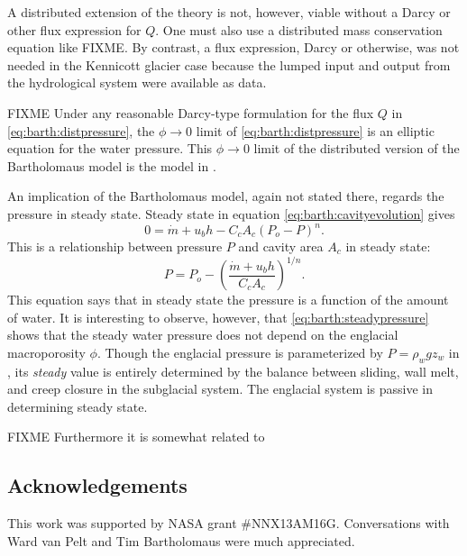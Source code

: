 \documentclass[twocolumn,letterpaper]{igs}
\begin{document}
A distributed extension of the \cite{Bartholomausetal2011} theory is not, however, viable without a Darcy or other flux expression for $Q$.  One must also use a distributed mass conservation equation like FIXME.  By contrast, a flux expression, Darcy or otherwise, was not needed in the Kennicott glacier case because the lumped input and output from the hydrological system were available as data.

FIXME  Under any reasonable Darcy-type formulation for the flux $Q$ in \eqref{eq:barth:distpressure}, the $\phi\to 0$ limit of \eqref{eq:barth:distpressure} is an elliptic equation for the water pressure.  This $\phi\to 0$ limit of the distributed version of the Bartholomaus model is the model in \cite{Schoofetal2012}.

An implication of the Bartholomaus model, again not stated there, regards the pressure in steady state.  Steady state in equation \eqref{eq:barth:cavityevolution} gives
\begin{equation*}
0 = \dot m + u_b h - C_c A_c (P_o-P)^n.
\end{equation*}
This is a relationship between pressure $P$ and cavity area $A_c$ in steady state:
\begin{equation}
P = P_o - \left(\frac{\dot m + u_b h}{C_c A_c}\right)^{1/n}. \label{eq:barth:steadypressure}
\end{equation}
This equation says that in steady state the pressure is a function of the amount of water.  It is interesting to observe, however, that \eqref{eq:barth:steadypressure} shows that the steady water pressure does not depend on the englacial macroporosity $\phi$.  Though the englacial pressure is parameterized by $P=\rho_w g z_w$ in \cite{Bartholomausetal2011}, its \emph{steady} value is entirely determined by the balance between sliding, wall melt, and creep closure in the subglacial system.  The englacial system is passive in determining steady state.

FIXME  Furthermore it is somewhat related to \citep{FlowersClarke2002_theory}


\subsection*{Acknowledgements}  This work was supported by NASA grant \#NNX13AM16G.  Conversations with Ward van Pelt and Tim Bartholomaus were much appreciated.



\end{document}
